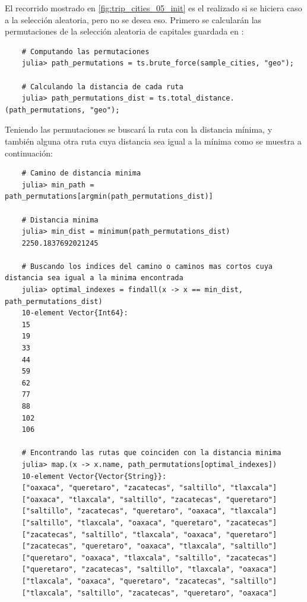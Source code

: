 El recorrido mostrado en \cref{fig:trip_cities_05_init} es el realizado si se hiciera caso a la selección aleatoria, pero no se desea eso. Primero se calcularán las permutaciones de la selección aleatoria de capitales guardada en :
\begin{verbatim}
    # Computando las permutaciones
    julia> path_permutations = ts.brute_force(sample_cities, "geo");

    # Calculando la distancia de cada ruta
    julia> path_permutations_dist = ts.total_distance.(path_permutations, "geo");
\end{verbatim}

Teniendo las permutaciones se buscará la ruta con la distancia mínima, y también alguna otra ruta cuya distancia sea igual a la mínima como se muestra a continuación:
\begin{verbatim}
    # Camino de distancia minima
    julia> min_path = path_permutations[argmin(path_permutations_dist)]

    # Distancia minima
    julia> min_dist = minimum(path_permutations_dist)
    2250.1837692021245

    # Buscando los indices del camino o caminos mas cortos cuya distancia sea igual a la minima encontrada
    julia> optimal_indexes = findall(x -> x == min_dist, path_permutations_dist)
    10-element Vector{Int64}:
    15
    19
    33
    44
    59
    62
    77
    88
    102
    106

    # Encontrando las rutas que coinciden con la distancia minima
    julia> map.(x -> x.name, path_permutations[optimal_indexes])
    10-element Vector{Vector{String}}:
    ["oaxaca", "queretaro", "zacatecas", "saltillo", "tlaxcala"]
    ["oaxaca", "tlaxcala", "saltillo", "zacatecas", "queretaro"]
    ["saltillo", "zacatecas", "queretaro", "oaxaca", "tlaxcala"]
    ["saltillo", "tlaxcala", "oaxaca", "queretaro", "zacatecas"]
    ["zacatecas", "saltillo", "tlaxcala", "oaxaca", "queretaro"]
    ["zacatecas", "queretaro", "oaxaca", "tlaxcala", "saltillo"]
    ["queretaro", "oaxaca", "tlaxcala", "saltillo", "zacatecas"]
    ["queretaro", "zacatecas", "saltillo", "tlaxcala", "oaxaca"]
    ["tlaxcala", "oaxaca", "queretaro", "zacatecas", "saltillo"]
    ["tlaxcala", "saltillo", "zacatecas", "queretaro", "oaxaca"]
\end{verbatim}

